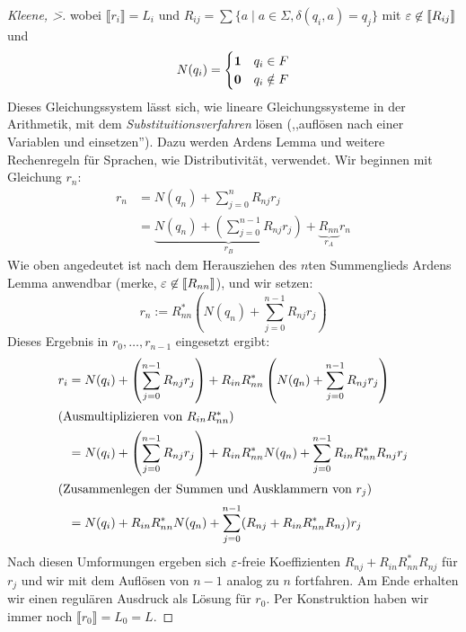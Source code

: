 {\begin{proof}[Kleene, \=>]
    wobei $\llbracket r_i \rrbracket = L_i$ und $R_{ij } = \sum \{a \mid a \in \Sigma, \delta(q_i, a) = q_j\}$ mit $\varepsilon \not \in \llbracket R_{ij} \rrbracket$ und
    \begin{displaymath}
      N(q_i) =
      \begin{cases}
        \mathbf{1} & q_i\in F\\
        \mathbf{0} & q_i\notin F
      \end{cases}
    \end{displaymath}
    Dieses Gleichungssystem lässt sich, wie lineare Gleichungssysteme in der Arithmetik, mit dem \emph{Substituitionsverfahren} lösen (,,auflösen nach einer Variablen und einsetzen'').
    Dazu werden Ardens Lemma und weitere Rechenregeln für Sprachen, wie Distributivität, verwendet.
    Wir beginnen mit Gleichung $r_n$:
    \begin{align*}
      r_n &= N(q_n) + \sum_{j = 0}^n R_{nj} r_j \\
          &= \underbrace{N(q_n) + \left (\sum_{j = 0}^{n-1} R_{nj} r_j \right)}_{r_B} + \underbrace{R_{nn}}_{r_A} r_n
    \end{align*}
    Wie oben angedeutet ist nach dem Herausziehen des $n$ten Summenglieds Ardens Lemma anwendbar (merke, $\varepsilon \not \in \llbracket R_{nn} \rrbracket$), und wir setzen:
    \begin{displaymath}
      r_n := R_{nn}^*\left(N(q_n) + \sum_{j = 0}^{n-1} R_{nj} r_j  \right)
    \end{displaymath}
    Dieses Ergebnis in $r_0,\ldots,r_{n-1}$ eingesetzt ergibt:
    \begin{align*}
      r_i &= N(q_i) + \left (\sum_{j = 0}^{n-1} R_{nj} r_j \right) + R_{in}R_{nn}^*\left(N(q_n) + \sum_{j = 0}^{n-1} R_{nj} r_j  \right) \\
      \intertext{(Ausmultiplizieren von $R_{in}R_{nn}^*$)}
          &= N(q_i) + \left (\sum_{j = 0}^{n-1} R_{nj} r_j \right) + R_{in}R_{nn}^*N(q_n) + \sum_{j = 0}^{n-1} R_{in}R_{nn}^*R_{nj} r_j  \\
      \intertext{(Zusammenlegen der Summen und Ausklammern von $r_j$)}
          &= N(q_i) + R_{in}R_{nn}^*N(q_n) + \sum_{j = 0}^{n-1} (R_{nj} + R_{in}R_{nn}^*R_{nj}) r_j  \\
    \end{align*}
  Nach diesen Umformungen ergeben sich $\varepsilon$-freie Koeffizienten $R_{nj} + R_{in}R_{nn}^*R_{nj}$ für $r_j$ und wir mit dem Auflösen von $n-1$ analog zu $n$ fortfahren.
  Am Ende erhalten wir einen regulären Ausdruck als Lösung für $r_0$.
  Per Konstruktion haben wir immer noch $\llbracket r_0 \rrbracket = L_0 = L$.
  \end{proof}
    

}
